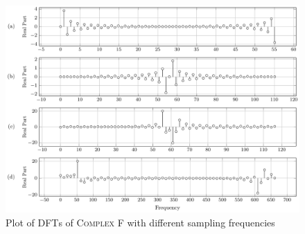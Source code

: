\documentclass[../../course]{subfiles}
\begin{document}
\vfill

\begin{figure} [H]
    \centering
     {
        \includegraphics[height = 0.8\textheight] {tikzpics/plotDftComplexF64.pdf}
    }
     {Plot of \textsc{DFT}s of \textsc{Complex F} with different sampling frequencies}
    \label{plt:dftComplexF}
\end{figure}
\end{document}

